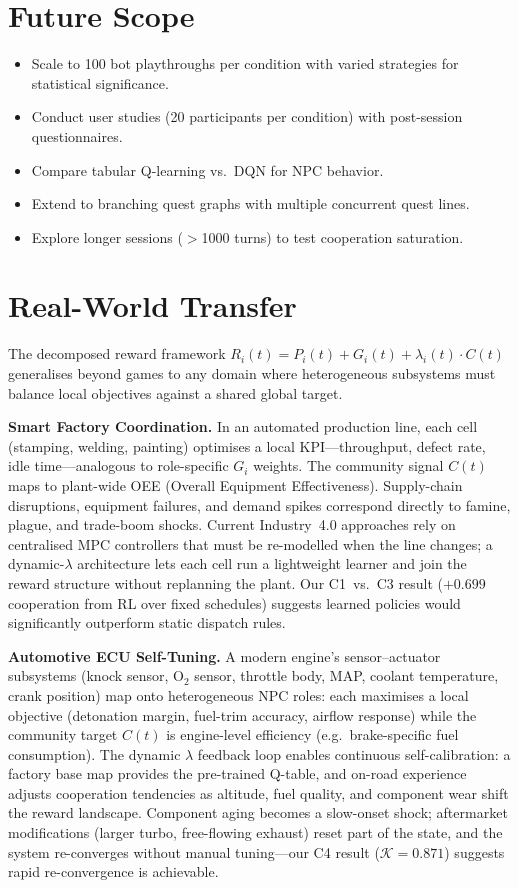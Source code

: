 \documentclass[12pt, a4paper, oneside]{report}
\begin{document}
\section{Future Scope}
\label{sec:future-scope}

\begin{itemize}[nosep]
    \item Scale to 100 bot playthroughs per condition with varied strategies for statistical significance.
    \item Conduct user studies (20 participants per condition) with post-session questionnaires.
    \item Compare tabular Q-learning vs.\ DQN for NPC behavior.
    \item Extend to branching quest graphs with multiple concurrent quest lines.
    \item Explore longer sessions ($>$1000 turns) to test cooperation saturation.
\end{itemize}

\section{Real-World Transfer}
\label{sec:real-world-transfer}

The decomposed reward framework $R_i(t) = P_i(t) + G_i(t) + \lambda_i(t) \cdot C(t)$ generalises beyond games to any domain where heterogeneous subsystems must balance local objectives against a shared global target.

\textbf{Smart Factory Coordination.}
In an automated production line, each cell (stamping, welding, painting) optimises a local KPI---throughput, defect rate, idle time---analogous to role-specific $G_i$ weights. The community signal $C(t)$ maps to plant-wide OEE (Overall Equipment Effectiveness). Supply-chain disruptions, equipment failures, and demand spikes correspond directly to famine, plague, and trade-boom shocks. Current Industry~4.0 approaches rely on centralised MPC controllers that must be re-modelled when the line changes; a dynamic-$\lambda$ architecture lets each cell run a lightweight learner and join the reward structure without replanning the plant. Our C1~vs.~C3 result ($+0.699$ cooperation from RL over fixed schedules) suggests learned policies would significantly outperform static dispatch rules.

\textbf{Automotive ECU Self-Tuning.}
A modern engine's sensor--actuator subsystems (knock sensor, O$_2$ sensor, throttle body, MAP, coolant temperature, crank position) map onto heterogeneous NPC roles: each maximises a local objective (detonation margin, fuel-trim accuracy, airflow response) while the community target $C(t)$ is engine-level efficiency (e.g.\ brake-specific fuel consumption). The dynamic $\lambda$ feedback loop enables continuous self-calibration: a factory base map provides the pre-trained Q-table, and on-road experience adjusts cooperation tendencies as altitude, fuel quality, and component wear shift the reward landscape. Component aging becomes a slow-onset shock; aftermarket modifications (larger turbo, free-flowing exhaust) reset part of the state, and the system re-converges without manual tuning---our C4 result ($\mathcal{K} = 0.871$) suggests rapid re-convergence is achievable.
\end{document}
